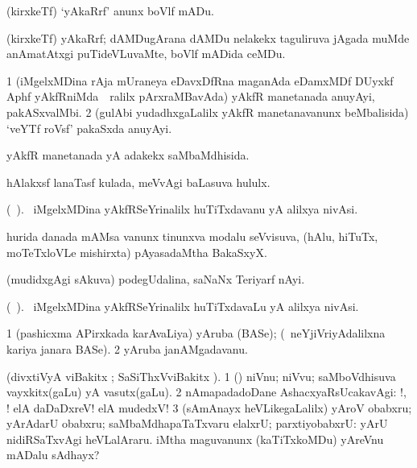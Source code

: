 \bentry
{} 
\gl{\sakirx} 
\bmng
(kirxkeTf) `yAkaRrf' anunx boVlf mADu.
\emng
\eentry

\bentry
{} 
\gl{\nA} 
\bmng
(kirxkeTf) yAkaRrf;  dAMDugArana dAMDu nelakekx taguliruva jAgada muMde anAmatAtxgi puTideVLuvaMte, boVlf mADida ceMDu.
\emng
\eentry

\bentry
{} 
\gl{\nA} 
\bmng
\bnum
\num{1} (iMgelxMDina rAja mUraneya eDavxDfRna maganAda eDamxMDf DUyxkf Aphf yAkfRniMda \kirxsha\, \,ralilx  pArxraMBavAda) yAkfR manetanada anuyAyi, pakASxvalMbi. 
\num{2} (gulAbi yudadhxgaLalilx yAkfR manetanavanunx beMbalisida) `veYTf roVsf' pakaSxda anuyAyi.
\enum
\emng
\eentry

\bentry
{} 
\gl{\gu} 
\bmng
yAkfR manetanada yA adakekx saMbaMdhisida.
\emng
\eentry

\bentry
{}
\gl{\saMkiSx}  
\bmng
{}
\emng
\eentry

\bentry
{}  
\gl{\nA} 
\bmng
hAlakxsf lanaTasf kulada, meVvAgi baLasuva hululx.
\emng
\eentry

\bentry
{} 
\gl{\nA} 
\bmng
(\bava\ ). 
\kanu\ iMgelxMDina yAkfRSeYrinalilx huTiTxdavanu yA alilxya nivAsi.
\emng
\eentry

\bentry
{}
\gl{\nA} 
\bmng
hurida danada mAMsa \mo vanunx tinunxva modalu seVvisuva, (hAlu, hiTuTx, moTeTxloVLe  mishirxta) pAyasadaMtha BakaSxyX.
\emng
\eentry

\bentry
{}
\gl{\nA} 
\bmng
(mudidxgAgi sAkuva) podegUdalina, saNaNx Teriyarf nAyi.
\emng
\eentry

\bentry
{} 
\gl{\nA} 
\bmng
(\bava\ ).
\kanu\ iMgelxMDina yAkfRSeYrinalilx huTiTxdavaLu yA alilxya nivAsi.
\emng
\eentry

\bentry
{} 
\gl{\nA} 
\bmng
\bnum
\num{1} (pashicxma APirxkada karAvaLiya) yAruba (BASe); (\kanmu\ neYjiVriyAdalilxna kariya janara BASe). 
\num{2} yAruba janAMgadavanu.
\enum
\emng
\eentry

\bentry
{} 
\gl{\sanA} 
\bmng
(divxtiVyA viBakitx ; SaSiThxVviBakitx ). 
\bnum
\num{1} (\Eva)  niVnu; niVvu; saMboVdhisuva vayxkitx(gaLu) yA vasutx(gaLu). 
\num{2} nAmapadadoDane AshacxyaRsUcakavAgi: !, ! elA daDaDxreV! elA mudedxV! 
\num{3} (sAmAnayx heVLikegaLalilx) yAroV obabxru; yArAdarU obabxru; saMbaMdhapaTaTxvaru elalxrU; parxtiyobabxrU:  yArU nidiRSaTxvAgi heVLalAraru.  iMtha maguvanunx (kaTiTxkoMDu) yAreVnu mADalu sAdhayx?
\enum
\emng

